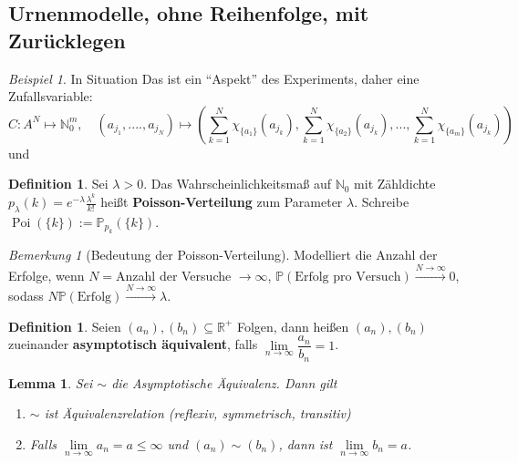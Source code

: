 \documentclass[10pt,a4paper]{article}
\newcommand{\N}{\ensuremath{\mathbb{N}}}
\newcommand{\R}{\ensuremath{\mathbb{R}}}
\newcommand{\la}{\ensuremath{\lambda}}
\newcommand{\Prb}{\mathbb P}
\newcommand{\Poi}{\operatorname{Poi}}
\theoremstyle{plain}
\newtheorem{lem}[theorem]{Lemma}
\theoremstyle{definition}
\newtheorem{definition}[theorem]{Definition}
\theoremstyle{remark}
\newtheorem*{bem*}{Bemerkung}
\newtheorem*{exm*}{Beispiel}
\begin{document}
	\subsection{Urnenmodelle, ohne Reihenfolge, mit Zurücklegen}
	\begin{exm*}
		In Situation %
		Das ist ein \enquote{Aspekt} des Experiments, daher eine Zufallsvariable:
		\[C:A^N\mapsto \N_0^m,\quad (a_{j_1},....,a_{j_N})\mapsto\left(\sum_{k=1}^{N}\chi_{\{a_1\}}(a_{j_k}),\sum_{k=1}^{N}\chi_{\{a_2\}}(a_{j_k}),...,\sum_{k=1}^{N}\chi_{\{a_m\}}(a_{j_k})\right)\]
		und
	\end{exm*}
	
	\begin{definition}
		Sei $\la>0$. Das Wahrscheinlichkeitsmaß auf $\N_0$ mit Zähldichte $p_\la(k)=e^{-\la}\frac{\la^k}{k!}$ heißt \textbf{Poisson-Verteilung} zum Parameter $\la$. Schreibe $\Poi(\{k\}):=\Prb_{p_k}(\{k\})$.
	\end{definition}
	
\setcounter{theorem}{14}

	\begin{bem*}[Bedeutung der Poisson-Verteilung]
		Modelliert die Anzahl der Erfolge, wenn $N=$Anzahl der Versuche $\to\infty$, $\Prb(\text{Erfolg pro Versuch})\xrightarrow{N\to\infty}0$, sodass $N\Prb(\text{Erfolg})\xrightarrow{N\to\infty}\la$.
	\end{bem*}
	\begin{definition}
		Seien $(a_n),(b_n)\subseteq\R^+$ Folgen, dann heißen $(a_n),(b_n)$ zueinander \textbf{asymptotisch äquivalent}, falls $\lim\limits_{n\to\infty}\dfrac{a_n}{b_n}=1$.
	\end{definition}
	\begin{lem}
		Sei $\sim$ die Asymptotische Äquivalenz. Dann gilt
		\begin{enumerate}[label=\alph*)]
			\item $\sim$ ist Äquivalenzrelation (reflexiv, symmetrisch, transitiv)
			\item Falls $\lim\limits_{n\to\infty}a_n=a\leq \infty$ und $(a_n)\sim (b_n)$, dann ist $\lim\limits_{n\to\infty}b_n=a$.
		\end{enumerate}
	\end{lem}
	
\end{document}
